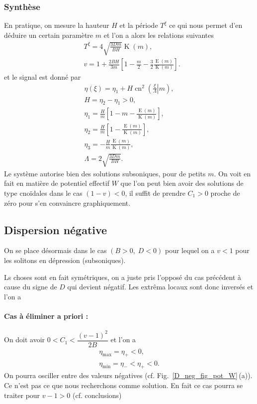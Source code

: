 \documentclass[10pt,a4paper, oneside, fleqn]{myarticle}
\DeclareMathOperator{\ellipE}{E}
\DeclareMathOperator{\ellipK}{K}
\DeclareMathOperator{\cn}{cn}
\begin{document}
\subsubsection{Synthèse }

En pratique, on mesure la hauteur $H$ et la période $T^\xi$ ce qui nous permet d'en déduire un certain paramètre $m$ et l'on a alors les relations suivantes
\begin{align}
  & T^\xi = 4 \sqrt{\frac{3 D m}{B H}}\ellipK(m),\\
  & v = 1 + \frac{2BH} {3m} \left[1 - \frac{m}{2} - \frac{3}{2} \frac{\ellipE(m)}{\ellipK(m)}  \right].
\end{align}
et le signal est donné par
\begin{gather}
  \eta(\xi) = \eta_1 + H \cn^2\left(\left.\frac{\xi}{\Lambda}\right\vert m\right),\\
  H = \eta_2-\eta_1 >0,\\
  \eta_1 = \frac{H}{m}\left[1-m-\frac{\ellipE(m)}{\ellipK(m)}\right],\\
  \eta_2 = \frac{H}{m}\left[1-\frac{\ellipE(m)}{\ellipK(m)}\right],\\
  \eta_3 = -\frac{H}{m}\frac{\ellipE(m)}{\ellipK(m)},\\
  \Lambda = 2\sqrt{\frac{3 D m}{BH}}.
\end{gather}
Le système autorise bien des solutions subsoniques, pour de petits $m$. On voit en fait en matière de potentiel effectif $W$ que l'on peut bien avoir des solutions de type cnoïdales dans le cas $(1-v)<0$, il suffit de prendre $C_1>0$ proche de zéro pour s'en convaincre graphiquement.



\subsection{Dispersion négative }

On se place désormais dans le cas $(B>0, \; D<0)$ pour lequel on a  $v<1$ pour les solitons en dépression (subsoniques).

Ls choses sont en fait symétriques, on a juste pris l'opposé du cas précédent à cause du signe de $D$ qui devient négatif. Les extrêma locaux sont donc inversés et l'on a



\medskip

\paragraph{Cas  à éliminer a priori : } On doit avoir $0<C_1<\dfrac{(v-1)^2}{2B}$ et l'on a
\begin{gather}
  \eta_{\max} = \eta_+ <0,\\
  \eta_{\min} = \eta_-<\eta_+<0.
\end{gather}
On pourra osciller entre des valeurs négatives (cf. Fig.~\ref{D_neg_fig_pot_W}\,(a)). Ce n'est pas ce que nous recherchons comme solution. En fait ce cas pourra se traiter pour $v-1>0$ (cf. conclusions)
\end{document}
